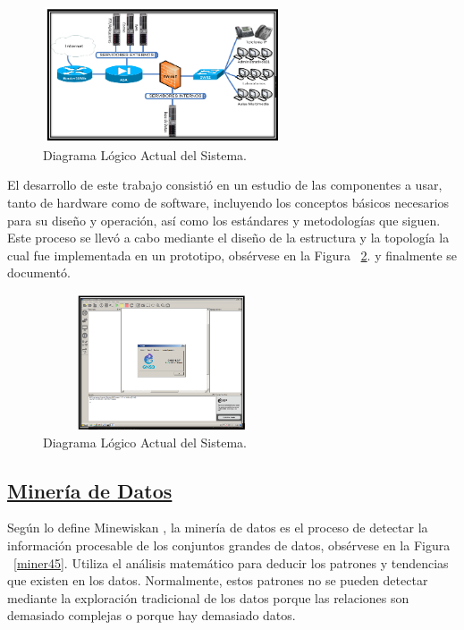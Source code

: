\documentclass[10pt,journal]{IEEEtran}
\begin{document}
\begin{itemize}
    \begin{figure}[H]
      \begin{center}
        \includegraphics[width=7cm, height=4cm]{figuras/criptoinv2.PNG}
        \caption{Diagrama Lógico Actual del Sistema.}
        \label{criptoinv2} 
        \end{center}
    \end{figure}     
    
        El desarrollo de este trabajo consistió en un estudio de las componentes a usar, tanto de hardware como de software, incluyendo los conceptos básicos necesarios para su diseño y operación, así como los estándares y metodologías que siguen. Este proceso se llevó a cabo mediante el diseño de la estructura y la topología la cual fue implementada en un prototipo, obsérvese en la Figura ~\ref{criptoinv4}. y finalmente se documentó.
        
      \begin{figure}[H]
      \begin{center}
        \includegraphics[width=7cm, height=4cm]{figuras/criptoinv4.PNG}
        \caption{Diagrama Lógico Actual del Sistema.}
        \label{criptoinv4} 
        \end{center}
    \end{figure}
    \end{itemize}
    
    \subsection{\underline{\textbf{Minería de Datos}}}
    Según lo define Minewiskan \citep{Conceptomine}, la minería de datos es el proceso de detectar la información procesable de los conjuntos grandes de datos, obsérvese en la Figura ~\ref{miner45}. Utiliza el análisis matemático para deducir los patrones y tendencias que existen en los datos. Normalmente, estos patrones no se pueden detectar mediante la exploración tradicional de los datos porque las relaciones son demasiado complejas o porque hay demasiado datos.
    
\end{document}
